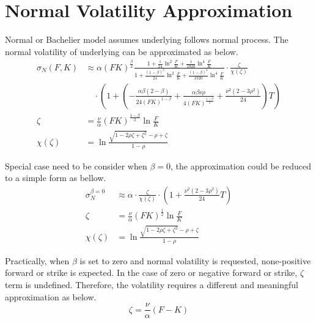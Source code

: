\documentclass{article}
\begin{document}
\section{Normal Volatility Approximation}

Normal or Bachelier model assumes underlying follows normal process.
The normal volatility of underlying can be approximated as below.
\begin{subequations}
    \begin{align}
        \sigma_N{(F, K)} &\approx \alpha {\left(F K\right)}^{\frac{\beta}{2}} \frac{1 + \frac{1}{24} \ln^2{\frac{F}{K}} + \frac{1}{1920} \ln^4{\frac{F}{K}}}{1 + \frac{\left(1 - \beta\right)^{2}}{24} \ln^2{\frac{F}{K}} + \frac{\left(1 - \beta\right)^{4}}{1920} \ln^4{\frac{F}{K}}} \cdot \frac{\zeta}{\chi \left(\zeta\right)}\nonumber \\
        & \quad \cdot \left(1 + \left(-\frac{\alpha \beta (2 - \beta)}{24 {\left(F K\right)}^{1 - \beta}} + \frac{\alpha \beta \nu \rho}{4 {\left(F K\right)}^{\frac{1 - \beta}{2}}} + \frac{\nu^2 \left(2 - 3 \rho^2\right)}{24}\right) T \right)\\
        \zeta &= \frac{\nu}{\alpha} {(F K)}^{\frac{1 - \beta}{2}} \ln{\frac{F}{K}} \\
        \chi(\zeta) &= \ln{\frac{\sqrt{1 - 2 \rho \zeta + {\zeta}^2} - \rho + \zeta}{1 - \rho}}
    \end{align}
\end{subequations}

Special case need to be consider when $ \beta = 0 $, the approximation could be reduced to a simple form as bellow.
\begin{subequations}
    \begin{align}
        \sigma_N^{\beta=0} &\approx \alpha \cdot \frac{\zeta}{\chi(\zeta)} \cdot \left(1 + \frac{\nu^2 \left(2 - 3 \rho^2\right)}{24} T \right) \\
        \zeta &= \frac{\nu}{\alpha} (F K)^{\frac{1}{2}} \ln{\frac{F}{K}} \\
        \chi(\zeta) &= \ln{\frac{\sqrt{1 - 2 \rho \zeta + \zeta^2} - \rho + \zeta}{1 - \rho}}
    \end{align}
\end{subequations}

Practically, when $ \beta $ is set to zero and normal volatility is requested, none-positive forward or strike is expected.
In the case of zero or negative forward or strike, $ \zeta $ term is undefined.
Therefore, the volatility requires a different and meaningful approximation as below.
\begin{equation}
    \zeta = \frac{\nu}{\alpha} \left(F - K\right)
\end{equation}
\end{document}
